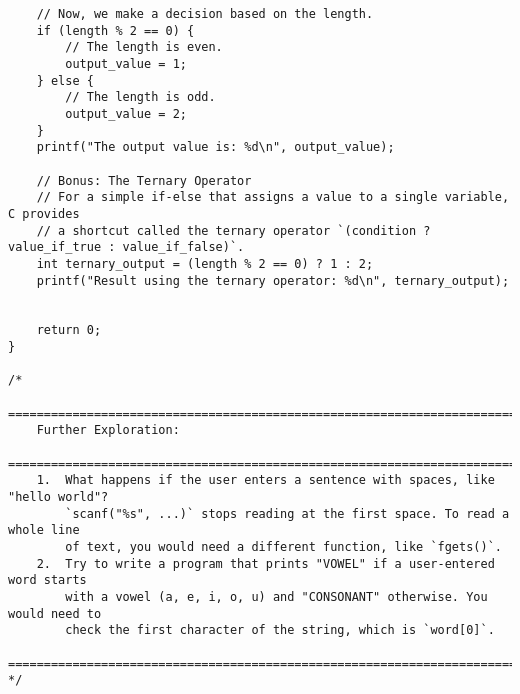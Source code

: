 \documentclass[11pt]{book}
\begin{document}
\begin{verbatim}
    // Now, we make a decision based on the length.
    if (length % 2 == 0) {
        // The length is even.
        output_value = 1;
    } else {
        // The length is odd.
        output_value = 2;
    }
    printf("The output value is: %d\n", output_value);

    // Bonus: The Ternary Operator
    // For a simple if-else that assigns a value to a single variable, C provides
    // a shortcut called the ternary operator `(condition ? value_if_true : value_if_false)`.
    int ternary_output = (length % 2 == 0) ? 1 : 2;
    printf("Result using the ternary operator: %d\n", ternary_output);


    return 0;
}

/*
    ================================================================================
    Further Exploration:
    ================================================================================
    1.  What happens if the user enters a sentence with spaces, like "hello world"?
        `scanf("%s", ...)` stops reading at the first space. To read a whole line
        of text, you would need a different function, like `fgets()`.
    2.  Try to write a program that prints "VOWEL" if a user-entered word starts
        with a vowel (a, e, i, o, u) and "CONSONANT" otherwise. You would need to
        check the first character of the string, which is `word[0]`.
    ================================================================================
*/

\end{verbatim}
\clearpage
\end{document}
